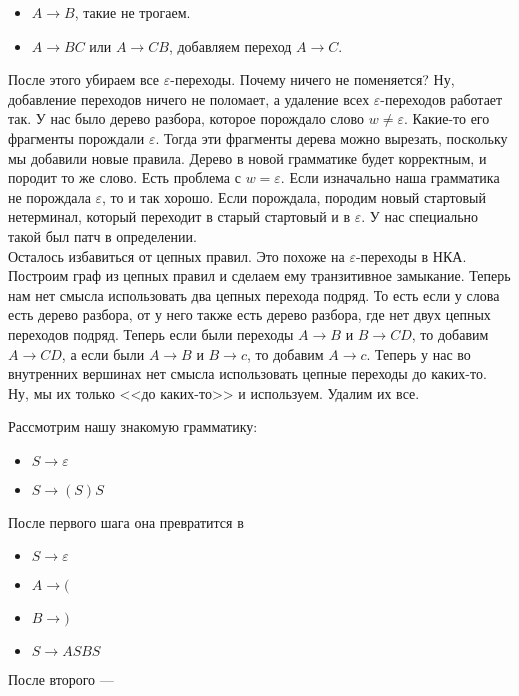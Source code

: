 \documentclass{article}
\begin{document}
\begin{itemize}
\begin{Proof}
\begin{itemize}
                \item $A\to B$, такие не трогаем.
                \item $A\to BC$ или $A\to CB$, добавляем переход $A\to C$.
            \end{itemize}
            После этого убираем все $\varepsilon$-переходы. Почему ничего не поменяется? Ну, добавление переходов ничего не поломает, а удаление всех $\varepsilon$-переходов работает так. У нас было дерево разбора, которое порождало слово $w\neq\varepsilon$. Какие-то его фрагменты порождали $\varepsilon$. Тогда эти фрагменты дерева можно вырезать, поскольку мы добавили новые правила. Дерево в новой грамматике будет корректным, и породит то же слово. Есть проблема с $w=\varepsilon$. Если изначально наша грамматика не порождала $\varepsilon$, то и так хорошо. Если порождала, породим новый стартовый нетерминал, который переходит в старый стартовый и в $\varepsilon$. У нас специально такой был патч в определении.\\
            Осталось избавиться от цепных правил. Это похоже на $\varepsilon$-переходы в НКА. Построим граф из цепных правил и сделаем ему транзитивное замыкание. Теперь нам нет смысла использовать два цепных перехода подряд. То есть если у слова есть дерево разбора, от у него также есть дерево разбора, где нет двух цепных переходов подряд. Теперь если были переходы $A\to B$ и $B\to CD$, то добавим $A\to CD$, а если были $A\to B$ и $B\to c$, то добавим $A\to c$. Теперь у нас во внутренних вершинах нет смысла использовать цепные переходы до каких-то. Ну, мы их только <<до каких-то>> и используем. Удалим их все.
        \end{Proof}
        \begin{Example}
            Рассмотрим нашу знакомую грамматику:
            \begin{itemize}
                \item $S\to\varepsilon$
                \item $S\to(S)S$
            \end{itemize}
            После первого шага она превратится в
            \begin{itemize}
                \item $S\to\varepsilon$
                \item $A\to{(}$
                \item $B\to{)}$
                \item $S\to ASBS$
            \end{itemize}
            После второго ---

\end{Example}
\end{itemize}
\end{document}
